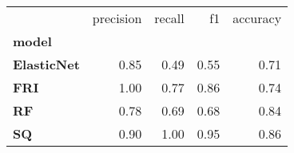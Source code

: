\begin{tabular}{lrrrr}
\toprule
{} &  precision &  recall &   f1 &  accuracy \\
\textbf{model     } &            &         &      &           \\
\midrule
\textbf{ElasticNet} &       0.85 &    0.49 & 0.55 &      0.71 \\
\textbf{FRI       } &       1.00 &    0.77 & 0.86 &      0.74 \\
\textbf{RF        } &       0.78 &    0.69 & 0.68 &      0.84 \\
\textbf{SQ        } &       0.90 &    1.00 & 0.95 &      0.86 \\
\bottomrule
\end{tabular}
